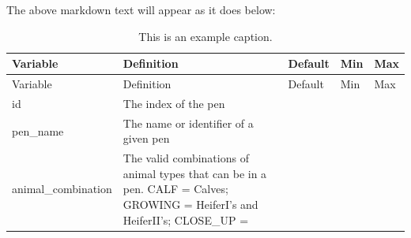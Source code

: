 \documentclass[
  letterpaper,
  oneside,
  openany]{scrbook}
\begin{document}
The above markdown text will appear as it does below:

\begin{longtable}[]{@{}
  >{\raggedright\arraybackslash}p{}
  >{\raggedright\arraybackslash}p{}
  >{\raggedright\arraybackslash}p{}
  >{\raggedright\arraybackslash}p{}
  >{\raggedright\arraybackslash}p{}@{}}
\caption{This is an example
caption.}\label{tbl-example-inputs}\tabularnewline
\toprule\noalign{}
\begin{minipage}[b]{\linewidth}\raggedright
Variable
\end{minipage} & \begin{minipage}[b]{\linewidth}\raggedright
Definition
\end{minipage} & \begin{minipage}[b]{\linewidth}\raggedright
Default
\end{minipage} & \begin{minipage}[b]{\linewidth}\raggedright
Min
\end{minipage} & \begin{minipage}[b]{\linewidth}\raggedright
Max
\end{minipage} \\
\midrule\noalign{}
\endfirsthead
\toprule\noalign{}
\begin{minipage}[b]{\linewidth}\raggedright
Variable
\end{minipage} & \begin{minipage}[b]{\linewidth}\raggedright
Definition
\end{minipage} & \begin{minipage}[b]{\linewidth}\raggedright
Default
\end{minipage} & \begin{minipage}[b]{\linewidth}\raggedright
Min
\end{minipage} & \begin{minipage}[b]{\linewidth}\raggedright
Max
\end{minipage} \\
\midrule\noalign{}
\endhead
\bottomrule\noalign{}
\endlastfoot
id & The index of the pen & & 0 & \\
pen\_name & The name or identifier of a given pen & & & \\
animal\_combination & The valid combinations of animal types that can be
in a pen. CALF = Calves; GROWING = HeiferI's and HeiferII's; CLOSE\_UP =

\end{longtable}
\end{document}
